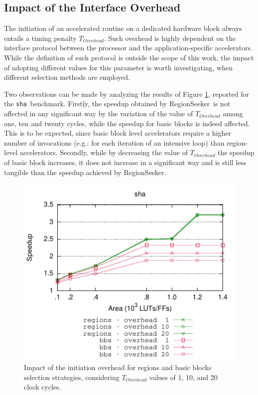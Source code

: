 \documentclass[]{usiinfthesis}
\newcommand{\rseeker}{{RegionSeeker}}
\newcommand{\sha}{\texttt{sha}}
\begin{document}
\subsection{Impact of the Interface Overhead}
\label{subsec:res_overhead}

The initiation of an accelerated routine on a dedicated hardware block
always entails a timing penalty $T_{Overhead}$.  Such overhead is
highly dependent on the interface protocol between the processor and
the application-specific accelerators. While the definition of such
protocol is outside the scope of this work, the
impact of adopting different values for this parameter is worth investigating, 
when different selection methods are employed.\par

Two observations can be made by analyzing the results of Figure
\ref{fig:overhead}, reported for the \sha\ benchmark. Firstly, the speedup 
obtained by \rseeker\ is not
affected in any significant way by the variation of the value of
$T_{Overhead}$ among one, ten and twenty cycles, while the speedup for
basic blocks is indeed affected. This is to be expected, since basic
block level accelerators require a higher number of invocations (e.g.:
for each iteration of an intensive loop) than region-level
accelerators. Secondly, while by decreasing the value of
$T_{Overhead}$ the speedup of basic block increases, it does not
increase in a significant way and is still %
less tangible than the speedup achieved by \rseeker.

\begin{figure}[h]
\centering
\includegraphics[width=0.6 \linewidth]
{figs/overhead_sha}
\caption{Impact of the initiation overhead for regions and basic
  blocks selection strategies, considering $T_{Overhead}$ values of 1,
  10, and 20 clock cycles.}
\label{fig:overhead}
\end{figure}
\end{document}
